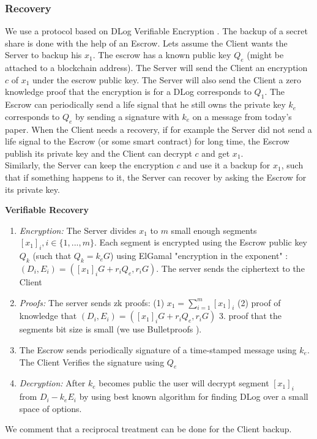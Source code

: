 \documentclass[runningheads]{llncs}
\begin{document}
\subsubsection{Recovery} We use a protocol based on DLog Verifiable Encryption \cite{cs03}. The backup of a secret share is done with the help of an Escrow. Lets assume the Client wants the Server to backup his $x_1$. The escrow has a known public key $Q_e$ (might be attached to a blockchain address). The Server will send the Client an encryption $c$ of $x_1$ under the escrow public key. The Server will also send the Client a zero knowledge proof that the encryption is for a DLog corresponds to $Q_1$. The Escrow can periodically send a life signal that he still owns the private key $k_e$ corresponds to $Q_e$ by sending a signature with $k_e$ on a message from today's paper. When the Client needs a recovery, if for example the Server did not send a life signal to the Escrow (or some smart contract) for long time, the Escrow publish its private key and the Client can decrypt $c$ and get $x_1$. \\
Similarly, the Server can keep the encryption $c$ and use it a backup for $x_1$, such that if something happens to it, the Server can recover by asking the Escrow for its private key.
\begin{mdframed}[userdefinedwidth = 12.3cm]
\textbf{Verifiable Recovery}
\begin{enumerate}

\item \textit{Encryption:} The Server divides $x_1$ to $m$ small enough segments $[x_1]_i, i\in \{1,...,m\}$. Each segment is encrypted using the Escrow public key $Q_k$ (such that $Q_k = k_eG$) using ElGamal "encryption in the exponent" : $(D_i, E_i) = ([x_1]_iG+r_iQ_e, r_iG)$. The server sends the ciphertext to the Client
\item \textit{Proofs:} The server sends zk proofs: (1)  $x_1 = \sum_{i=1}^{m}{[x_1]_i}$ (2)  proof of knowledge that $(D_i, E_i) = ([x_1]_iG+r_iQ_e, r_iG)$ 3. proof that the segments bit size is small (we use Bulletproofs \cite{bulletproof}).
\item The Escrow sends periodically signature of a time-stamped message using $k_e$. The Client Verifies the signature using $Q_e$
\item \textit{Decryption:} After $k_e$ becomes public the user will decrypt segment $[x_1]_i$ from $D_i - k_eE_i$ by using best known algorithm for finding DLog over a small space of options.
\end{enumerate}
\end{mdframed}
We comment that a reciprocal treatment can be done for the Client backup.
\end{document}

